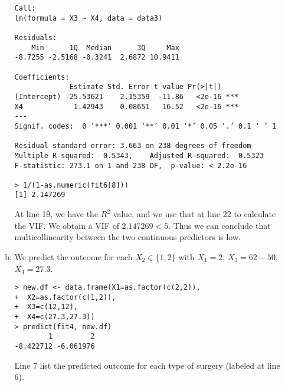 \documentclass[10pt]{article}
\begin{document}
\begin{enumerate}
\begin{enumerate}[a)]
\begin{lstlisting}
Call:
lm(formula = X3 ~ X4, data = data3)

Residuals:
    Min      1Q  Median      3Q     Max 
-8.7255 -2.5168 -0.3241  2.6872 10.9411 

Coefficients:
             Estimate Std. Error t value Pr(>|t|)    
(Intercept) -25.53621    2.15359  -11.86   <2e-16 ***
X4            1.42943    0.08651   16.52   <2e-16 ***
---
Signif. codes:  0 ‘***’ 0.001 ‘**’ 0.01 ‘*’ 0.05 ‘.’ 0.1 ‘ ’ 1

Residual standard error: 3.663 on 238 degrees of freedom
Multiple R-squared:  0.5343,    Adjusted R-squared:  0.5323 
F-statistic: 273.1 on 1 and 238 DF,  p-value: < 2.2e-16

> 1/(1-as.numeric(fit6[8]))
[1] 2.147269

		\end{lstlisting}
		At line 19, we have the $R^2$ value, and we use that at line 22 to calculate the VIF. We obtain a VIF of $2.147269 < 5$. Thus we can conclude that multicollinearity between the two continuous predictors is low. 
		\item We predict the outcome for each $X_2 \in \{1,2\}$ with $X_1 = 2$, $X_3 = 62-50$, $X_4 = 27.3$. 
		\begin{lstlisting}
> new.df <- data.frame(X1=as.factor(c(2,2)), 
+  X2=as.factor(c(1,2)), 
+  X3=c(12,12), 
+  X4=c(27.3,27.3))
> predict(fit4, new.df)
        1         2 
-8.422712 -6.061976 
		\end{lstlisting}
		Line 7 list the predicted outcome for each type of surgery (labeled at line 6). 
	\end{enumerate}
\end{enumerate}
\end{document}
